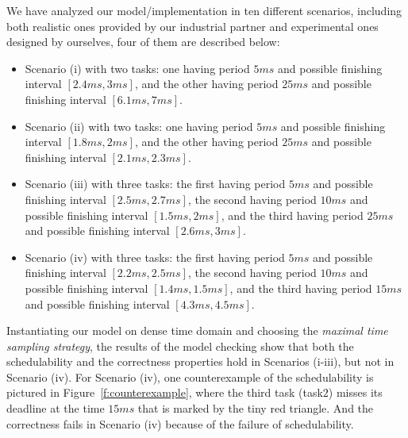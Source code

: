 \documentclass{llncs}
\begin{document}
We have analyzed our model/implementation in ten different scenarios,
including both realistic ones provided by our industrial partner and
experimental ones designed by ourselves, four of them are described
below:
\begin{itemize}
\item Scenario (i) with two tasks: one having period $5ms$ and
  possible finishing interval $[2.4ms, 3ms]$, and the other having
  period $25ms$ and possible finishing interval $[6.1ms, 7ms]$.
\item Scenario (ii) with two tasks: one having period $5ms$ and
  possible finishing interval $[1.8ms, 2ms]$, and the other having
  period $25ms$ and possible finishing interval $[2.1ms, 2.3ms]$.
\item Scenario (iii) with three tasks: the first having period $5ms$
  and possible finishing interval $[2.5ms, 2.7ms]$, the second having
  period $10ms$ and possible finishing interval $[1.5ms, 2ms]$, and
  the third having period $25ms$ and possible finishing interval
  $[2.6ms, 3ms]$.
\item Scenario (iv) with three tasks: the first having period $5ms$
  and possible finishing interval $[2.2ms, 2.5ms]$, the second having
  period $10ms$ and possible finishing interval $[1.4ms, 1.5ms]$, and
  the third having period $15ms$ and possible finishing interval
  $[4.3ms, 4.5ms]$.
\end{itemize}

Instantiating our model on dense time domain and choosing the
\emph{maximal time sampling strategy}, the results of the model
checking show that both the schedulability and the correctness
properties hold in Scenarios (i-iii), but not in Scenario (iv). For
Scenario (iv), one counterexample of the schedulability is pictured in
Figure~\ref{f:counterexample}, where the third task (task$2$) misses
its deadline at the time $15ms$ that is marked by the tiny red
triangle. And the correctness fails in Scenario (iv) because of the
failure of schedulability.
\end{document}

